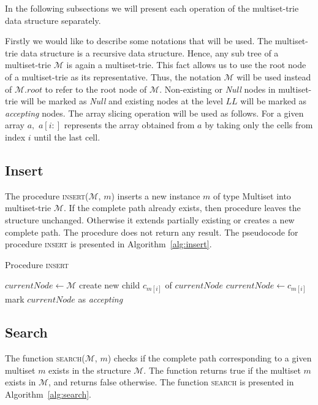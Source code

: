 In the following subsections we will present each operation of the multiset-trie 
data structure separately. 

Firstly we would like to describe some notations that will be used. The 
multiset-trie data structure is a recursive data structure. Hence, any sub 
tree of a multiset-trie $\mathcal{M}$ is again a multiset-trie. This fact allows 
us to use the root node of a multiset-trie as its representative. Thus, the notation 
$\mathcal{M}$ will be used instead of $\mathcal{M}.root$ to refer to the root 
node of $\mathcal{M}.$ Non-existing or \emph{Null} nodes in multiset-trie will 
be marked as \emph{Null} and existing nodes at the level $LL$ will be marked 
as \emph{accepting} nodes. The array slicing operation will be used as follows. 
For a given array $a,$ $a[i:]$ represents the array obtained from $a$ by taking 
only the cells from index $i$ until the last cell. 


\subsection{Insert} \label{s:insert}
The procedure \textsc{insert}($\mathcal{M}$, $m$) inserts a new instance $m$ of 
type Multiset into multiset-trie $\mathcal{M}$. If the complete path already 
exists, then procedure leaves the structure unchanged. Otherwise it extends 
partially existing or creates a new complete path. The procedure does not return 
any result. The pseudocode for procedure \textsc{insert} is presented in 
Algorithm~\ref{alg:insert}.


\begin{algorithm}[h!]
\caption{Procedure \textsc{insert}}
\label{alg:insert}
\begin{algorithmic}[1]
\State $currentNode \gets \mathcal{M}$
\State create new child $c_{m[i]}$ of $currentNode$
\EndIf
\State $currentNode \gets c_{m[i]}$
\EndFor
\State mark $currentNode$ as \emph{accepting}
\EndProcedure
\end{algorithmic}
\end{algorithm}

\subsection{Search}\label{s:search}
The function \textsc{search}($\mathcal{M}$, $m$) checks if the complete path corresponding to 
a given multiset $m$ exists in the structure $\mathcal{M}.$ The function returns 
true if the multiset $m$ exists in $\mathcal{M}$, and returns false otherwise. The 
function \textsc{search} is presented in Algorithm~\ref{alg:search}.

